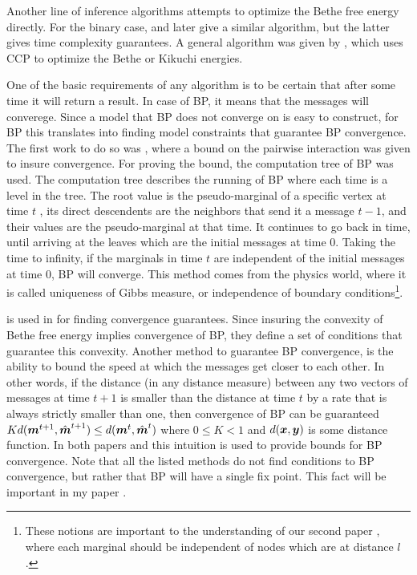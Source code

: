 Another line of inference algorithms attempts to optimize the Bethe free energy directly.
For the binary case, \cite{welling2001belief} and later \cite{shin2012complexity} give a similar algorithm, but the latter gives time complexity guarantees.
A general algorithm was given by \cite{yuille2002cccp}, which uses CCP\cite{yuille2002concave} to optimize the Bethe or Kikuchi energies.

One of the basic requirements of any algorithm is to be certain that after some time it will return a result.
In case of BP, it means that the messages will converege.
Since a model that BP does not converge on is easy to construct, for BP this translates into finding model constraints that guarantee BP convergence. 
The first work to do so was \cite{tatikonda2002loopy}, where a bound on the pairwise interaction was given to insure convergence.
For proving the bound, the computation tree of BP was used.
The computation tree describes the running of BP where each time is a level in the tree.
The root value is the pseudo-marginal of a specific vertex at time $t$ , its direct descendents are the neighbors that send it a message $t-1$, and their values are the pseudo-marginal at that time.
It continues to go back in time, until arriving at the leaves which are the initial messages at time $0$.
Taking the time to infinity, if the marginals in time $t$ are independent of the initial messages at time $0$, BP will converge.
This method comes from the physics world, where it is called uniqueness of Gibbs measure, or independence of boundary conditions\footnote{These notions are important to the understanding of our second paper \cite{heinemann2014inferning}, where each marginal should be independent of nodes which are at distance $l$.}.

 is used in \cite{heskes2004uniqueness} for finding convergence guarantees.
Since insuring the convexity of Bethe free energy implies convergence of BP, they define a set of conditions that guarantee this convexity.
Another method to guarantee BP convergence, is the ability to bound the speed at which the messages get closer to each other.
In other words, if the distance (in any distance measure) between any two vectors of messages at time $t+1$ is smaller than the distance at time $t$ by a rate that is always strictly smaller than one, then convergence of BP can be guaranteed $ K d(\boldsymbol{m}^{t+1}, \hat{\boldsymbol{m}}^{t+1}) \leq d(\boldsymbol{m}^t, \hat{\boldsymbol{m}}^t)$ where $0\leq K<1$ and $d(\boldsymbol{x},\boldsymbol{y})$ is some distance function.
In both papers \cite{mooij2007sufficient} and \cite{roosta2008convergence} this intuition is used to provide bounds for BP convergence.
Note that all the listed methods do not find conditions to BP convergence, but rather that BP will have a single fix point.
This fact will be important in my paper \cite{heinemann2012cannot}.

